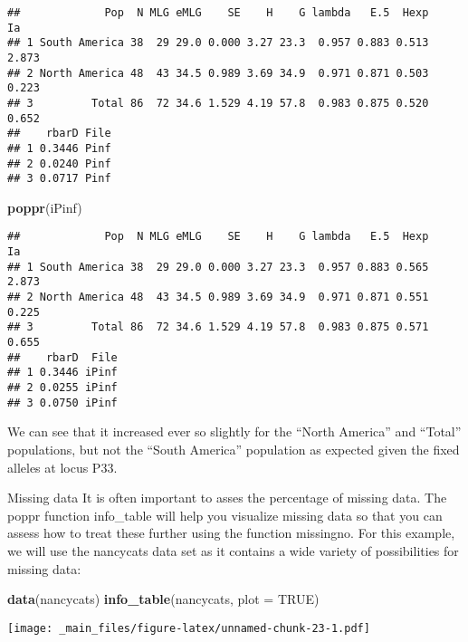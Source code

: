 \documentclass[12pt,]{krantz}
\newenvironment{Shaded}{\begin{snugshade}}{\end{snugshade}}
\newcommand{\KeywordTok}[1]{\textcolor[rgb]{0.27,0.27,0.27}{\textbf{#1}}}
\newcommand{\DataTypeTok}[1]{\textcolor[rgb]{0.27,0.27,0.27}{#1}}
\newcommand{\OtherTok}[1]{\textcolor[rgb]{0.56,0.35,0.01}{#1}}
\newcommand{\NormalTok}[1]{#1}
\theoremstyle{definition}
\theoremstyle{definition}
\theoremstyle{definition}
\theoremstyle{remark}
\begin{document}
\begin{verbatim}
##             Pop  N MLG eMLG    SE    H    G lambda   E.5  Hexp    Ia
## 1 South America 38  29 29.0 0.000 3.27 23.3  0.957 0.883 0.513 2.873
## 2 North America 48  43 34.5 0.989 3.69 34.9  0.971 0.871 0.503 0.223
## 3         Total 86  72 34.6 1.529 4.19 57.8  0.983 0.875 0.520 0.652
##    rbarD File
## 1 0.3446 Pinf
## 2 0.0240 Pinf
## 3 0.0717 Pinf
\end{verbatim}

\begin{Shaded}
\begin{Highlighting}[]
\KeywordTok{poppr}\NormalTok{(iPinf)}
\end{Highlighting}
\end{Shaded}

\begin{verbatim}
##             Pop  N MLG eMLG    SE    H    G lambda   E.5  Hexp    Ia
## 1 South America 38  29 29.0 0.000 3.27 23.3  0.957 0.883 0.565 2.873
## 2 North America 48  43 34.5 0.989 3.69 34.9  0.971 0.871 0.551 0.225
## 3         Total 86  72 34.6 1.529 4.19 57.8  0.983 0.875 0.571 0.655
##    rbarD  File
## 1 0.3446 iPinf
## 2 0.0255 iPinf
## 3 0.0750 iPinf
\end{verbatim}

We can see that it increased ever so slightly for the ``North America''
and ``Total'' populations, but not the ``South America'' population as
expected given the fixed alleles at locus P33.

Missing data It is often important to asses the percentage of missing
data. The poppr function info\_table will help you visualize missing
data so that you can assess how to treat these further using the
function missingno. For this example, we will use the nancycats data set
as it contains a wide variety of possibilities for missing data:

\begin{Shaded}
\begin{Highlighting}[]
\KeywordTok{data}\NormalTok{(nancycats)}
\KeywordTok{info_table}\NormalTok{(nancycats, }\DataTypeTok{plot =} \OtherTok{TRUE}\NormalTok{)}
\end{Highlighting}
\end{Shaded}

\texttt{[image: \_main\_files/figure-latex/unnamed-chunk-23-1.pdf]}
\end{document}
